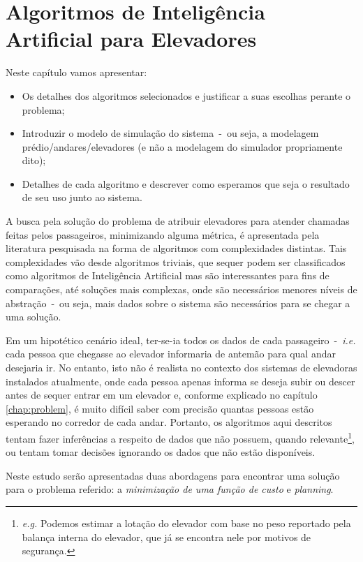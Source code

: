 \chapter{\label{chap:ai}Algoritmos de Inteligência Artificial para Elevadores}

Neste capítulo vamos apresentar:

\begin{itemize}
\item Os detalhes dos algoritmos selecionados e justificar a suas escolhas perante o problema;
\item Introduzir o modelo de simulação do sistema~-~ou seja, a modelagem
prédio/andares/elevadores (e não a modelagem do simulador propriamente dito);
\item Detalhes de cada algoritmo e descrever como esperamos que seja o resultado de seu uso junto ao sistema.
\end{itemize}

A busca pela solução do problema de atribuir elevadores para atender chamadas
feitas pelos passageiros, minimizando alguma métrica, é apresentada pela
literatura pesquisada na forma de algoritmos com complexidades distintas. Tais
complexidades vão desde algoritmos triviais, que sequer podem ser classificados
como algoritmos de Inteligência Artificial mas são interessantes para fins de
comparações, até soluções mais complexas, onde são necessários menores níveis de
abstração~-~ou seja, mais dados sobre o sistema são necessários para se chegar
a uma solução.

Em um hipotético cenário ideal, ter-se-ia todos os dados de cada
passageiro~-~\textit{i.e.} cada pessoa que chegasse ao elevador informaria de
antemão para qual andar desejaria ir. No entanto, isto não é realista no
contexto dos sistemas de elevadoras instalados atualmente, onde cada pessoa
apenas informa se deseja subir ou descer antes de sequer entrar em um elevador
e, conforme explicado no capítulo \ref{chap:problem}, é muito difícil saber com
precisão quantas pessoas estão esperando no corredor de cada andar. Portanto, os
algoritmos aqui descritos tentam fazer inferências a respeito de dados que não
possuem, quando relevante\footnote{\textit{e.g.} Podemos estimar a lotação do
elevador com base no peso reportado pela balança interna do elevador, que já se
encontra nele por motivos de segurança.}, ou tentam tomar decisões ignorando os
dados que não estão disponíveis.

Neste estudo serão apresentadas duas abordagens para encontrar uma solução para
o problema referido: a \textit{minimização de uma função de custo} e
\textit{planning}.

